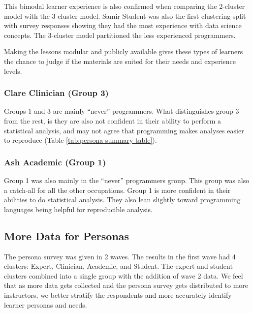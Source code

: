 \documentclass[020-persona\_validation.tex]{subfiles}
\begin{document}
            This bimodal learner experience is also confirmed when comparing the
            2-cluster model with the 3-cluster model. %
            Samir Student was also the first clustering split with survey responses showing
            they had the most experience with data science concepts.
            The 3-cluster model partitioned the less experienced programmers.

            Making the lessons modular and publicly available
            gives these types of learners the chance to judge if the materials are suited for their needs
            and experience levels.

        \subsubsection{Clare Clinician (Group 3)}

            Groups 1 and 3 are mainly ``never'' programmers.
            What distinguishes group 3 from the rest, is they are also not confident in
            their ability to perform a statistical analysis,
            and may not agree that programming makes analyses easier to reproduce (Table \ref{tab:persona-summary-table}).

        \subsubsection{Ash Academic (Group 1)}

            Group 1 was also mainly in the ``never'' programmers group.
            This group was also a catch-all for all the other occupations.
            Group 1 is more confident in their abilities to do statistical analysis.
            They also lean slightly toward programming languages being helpful for reproducible analysis.

    \subsection{More Data for Personas}

        The persona survey was given in 2 waves.
        The results in the first wave had 4 clusters: Expert, Clinician, Academic, and Student.
        The expert and student clusters combined into a single group with the addition of wave 2 data.
        We feel that as more data gets collected and the persona survey gets distributed to more
        instructors, we better stratify the respondents and more accurately identify learner personas and
        needs.
\end{document}
